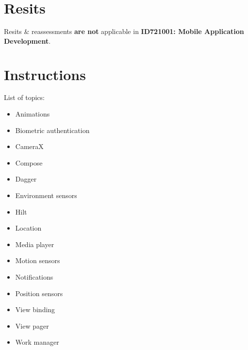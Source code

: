 \documentclass{article}
\begin{document}
\section*{Resits}
Resits \& reassessments \textbf{are not} applicable in \textbf{ID721001: Mobile Application Development}.

\section*{Instructions}

List of topics:

\begin{itemize}
	\item Animations
	\item Biometric authentication
	\item CameraX
	\item Compose
	\item Dagger
	\item Environment sensors
	\item Hilt
	\item Location
	\item Media player
	\item Motion sensors
	\item Notifications
	\item Position sensors
	\item View binding
	\item View pager
	\item Work manager
\end{itemize}
\end{document}
